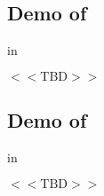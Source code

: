 \subsection{Demo of }

 in ~\citep{Schmidt2012pbdBASEpackage}

$<<\mbox{TBD}>>$


\subsection{Demo of }

 in 

$<<\mbox{TBD}>>$
